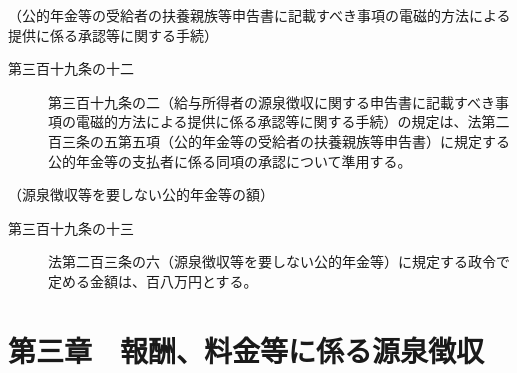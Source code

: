 \documentclass[twocolumn,a4j,10pt]{ltjtarticle}
\begin{document}
\noindent\hspace{10pt}（公的年金等の受給者の扶養親族等申告書に記載すべき事項の電磁的方法による提供に係る承認等に関する手続）
\begin{description}
\item[第三百十九条の十二]第三百十九条の二（給与所得者の源泉徴収に関する申告書に記載すべき事項の電磁的方法による提供に係る承認等に関する手続）の規定は、法第二百三条の五第五項（公的年金等の受給者の扶養親族等申告書）に規定する公的年金等の支払者に係る同項の承認について準用する。
\end{description}
\noindent\hspace{10pt}（源泉徴収等を要しない公的年金等の額）
\begin{description}
\item[第三百十九条の十三]法第二百三条の六（源泉徴収等を要しない公的年金等）に規定する政令で定める金額は、百八万円とする。
\end{description}
\section*{第三章　報酬、料金等に係る源泉徴収}
\end{document}
